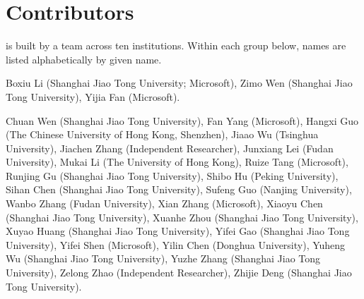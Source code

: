 \section*{Contributors}

\systemname is built by a team across ten institutions. Within each group below,
names are listed alphabetically by given name.

\vspace{0.4em}
\par
\vspace{0.15em}
\noindent
Boxiu Li (Shanghai Jiao Tong University; Microsoft),
Zimo Wen (Shanghai Jiao Tong University),
Yijia Fan (Microsoft).

\vspace{0.55em}
\par
\vspace{0.15em}
\noindent
Chuan Wen (Shanghai Jiao Tong University),
Fan Yang (Microsoft),
Hangxi Guo (The Chinese University of Hong Kong, Shenzhen),
Jiaao Wu (Tsinghua University),
Jiachen Zhang (Independent Researcher),
Junxiang Lei (Fudan University),
Mukai Li (The University of Hong Kong),
Ruize Tang (Microsoft),
Runjing Gu (Shanghai Jiao Tong University),
Shibo Hu (Peking University),
Sihan Chen (Shanghai Jiao Tong University),
Sufeng Guo (Nanjing University),
Wanbo Zhang (Fudan University),
Xian Zhang (Microsoft),
Xiaoyu Chen (Shanghai Jiao Tong University),
Xuanhe Zhou (Shanghai Jiao Tong University),
Xuyao Huang (Shanghai Jiao Tong University),
Yifei Gao (Shanghai Jiao Tong University),
Yifei Shen (Microsoft),
Yilin Chen (Donghua University),
Yuheng Wu (Shanghai Jiao Tong University),
Yuzhe Zhang (Shanghai Jiao Tong University),
Zelong Zhao (Independent Researcher),
Zhijie Deng (Shanghai Jiao Tong University).
